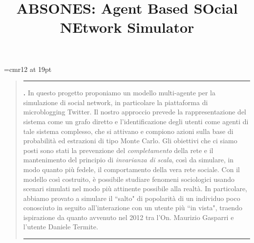 \documentclass[a4paper,12pt]{article}
\renewenvironment{abstract}
{\begin{quote}
\noindent \rule{\linewidth}{.5pt}\par{\bfseries \abstractname.}}
{\medskip\noindent \rule{\linewidth}{.5pt}
\end{quote}
}
\begin{document}
\font\myfont=cmr12 at 19pt
\title{\myfont ABSONES: Agent Based SOcial NEtwork Simulator}

\maketitle
%
\begin{abstract}
In questo progetto proponiamo un modello multi-agente per la simulazione di social network, in particolare la piattaforma di microblogging Twitter. Il nostro approccio prevede la rappresentazione del sistema come un grafo diretto e l'identificazione degli utenti come agenti di tale sistema complesso, che si attivano e compiono azioni sulla base di probabilità ed estrazioni di tipo Monte Carlo. Gli obiettivi che ci siamo posti sono stati la prevenzione del \textit{completamento} della rete e il mantenimento del principio di \textit{invarianza di scala}, così da simulare, in modo quanto più fedele, il comportamento della vera rete sociale. Con il modello così costruito, è possibile studiare fenomeni sociologici usando scenari simulati nel modo più attinente possibile alla realtà. In particolare, abbiamo provato a simulare il ``salto" di popolarità di un individuo poco conosciuto in seguito all'interazione con un utente più ``in vista", traendo ispirazione da quanto avvenuto nel 2012 tra l'On. Maurizio Gasparri e l'utente Daniele Termite. 
\end{abstract}

%


%
\end{document}

